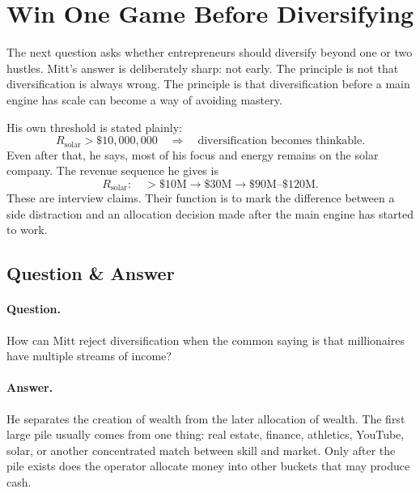 \section{Win One Game Before Diversifying}

The next question asks whether entrepreneurs should diversify beyond one or two hustles. Mitt's answer is deliberately sharp: not early. The principle is not that diversification is always wrong. The principle is that diversification before a main engine has scale can become a way of avoiding mastery.

His own threshold is stated plainly:
\begin{equation}
R_{\text{solar}}>\$10{,}000{,}000
\quad\Longrightarrow\quad
\text{diversification becomes thinkable}.
\end{equation}
Even after that, he says, most of his focus and energy remains on the solar company. The revenue sequence he gives is
\begin{equation}
R_{\text{solar}}:\quad
>\$10\text{M}\rightarrow \$30\text{M}\rightarrow \$90\text{M--}\$120\text{M}.
\end{equation}
These are interview claims. Their function is to mark the difference between a side distraction and an allocation decision made after the main engine has started to work.

\subsection{Question \& Answer}

\paragraph{Question.}
How can Mitt reject diversification when the common saying is that millionaires have multiple streams of income?

\paragraph{Answer.}
He separates the creation of wealth from the later allocation of wealth. The first large pile usually comes from one thing: real estate, finance, athletics, YouTube, solar, or another concentrated match between skill and market. Only after the pile exists does the operator allocate money into other buckets that may produce cash.

